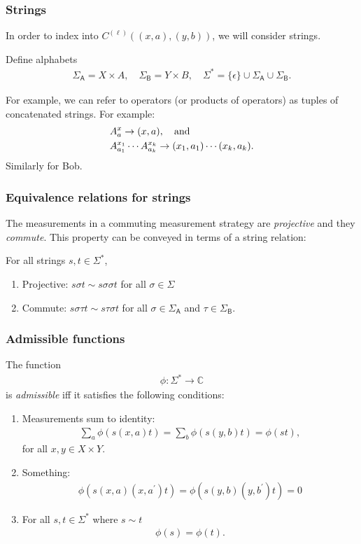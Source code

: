 \documentclass{beamer}
\def\complex{\mathbb{C}}
\def \SigmaA{\Sigma_{\reg{A}}}
\def \SigmaB{\Sigma_{\reg{B}}}
\newcommand{\reg}[1]{\mathsf{#1}}
\begin{document}
\begin{frame}
	\frametitle{Strings}
	In order to index into $C^{(\ell)}((x,a),(y,b))$, we will consider strings. 
	\vspace{5mm}
		
	Define alphabets 
	\begin{align*}
		\SigmaA = X \times A, \quad \SigmaB = Y \times B, \quad \Sigma^* = \{\epsilon\} \cup \SigmaA \cup \SigmaB. 
	\end{align*}

For example, we can refer to operators (or products of operators) as tuples of concatenated strings. For example:
\begin{equation}
	\begin{aligned}
		&A_a^x \rightarrow (x,a), \quad \textnormal{and} \nonumber \\
		&A_{a_1}^{x_1} \cdots A_{a_k}^{x_k} \rightarrow (x_1,a_1) \cdots (x_k,a_k). \nonumber
	\end{aligned}
\end{equation}
Similarly for Bob.

\end{frame}

\begin{frame}
	\frametitle{Equivalence relations for strings}
The measurements in a commuting measurement strategy are \emph{projective} and they \emph{commute}. This property can be conveyed in terms of a string relation:
	\vspace{5mm}
	
	For all strings $s,t \in \Sigma^*$, 
	\begin{enumerate}
		\item Projective: $s \sigma t \sim s \sigma \sigma t$ for all $\sigma \in \Sigma$
		\item Commute: $s \sigma \tau t \sim s \tau \sigma t$ for all $\sigma \in \SigmaA$ and $\tau \in \SigmaB$. 
	\end{enumerate}
\end{frame}

\begin{frame}
	\frametitle{Admissible functions}	
	The function
		\begin{align*}
			\phi : \Sigma^* \rightarrow \complex
		\end{align*}
		is \emph{admissible} iff it satisfies the following conditions:
		\begin{enumerate}
			\item Measurements sum to identity:
				\begin{align*}
					\sum_a \phi(s(x,a)t) = \sum_b \phi(s(y,b)t) = \phi(st),
				\end{align*}
				for all $x,y \in X \times Y$. 
			\item Something:
				\begin{align*}
					\phi(s(x,a)(x,a^{\prime})t) = \phi(s(y,b)(y,b^{\prime})t) = 0
				\end{align*}
			\item For all $s,t \in \Sigma^*$ where $s \sim t$
				\begin{align*}
					\phi(s) = \phi(t).
				\end{align*}
		\end{enumerate}
\end{frame}
\end{document}
